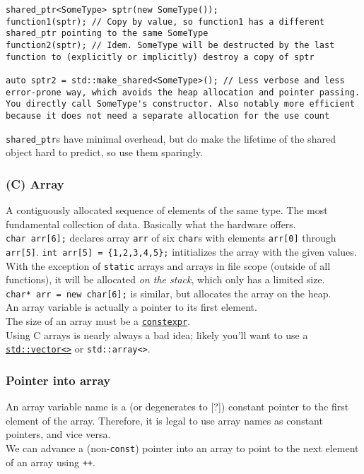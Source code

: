 \documentclass[8pt, table, xcdraw]{article}%
\begin{document}
\begin{lstlisting}
shared_ptr<SomeType> sptr(new SomeType());
function1(sptr); // Copy by value, so function1 has a different shared_ptr pointing to the same SomeType
function2(sptr); // Idem. SomeType will be destructed by the last function to (explicitly or implicitly) destroy a copy of sptr

auto sptr2 = std::make_shared<SomeType>(); // Less verbose and less error-prone way, which avoids the heap allocation and pointer passing. You directly call SomeType's constructor. Also notably more efficient because it does not need a separate allocation for the use count
\end{lstlisting}

\lstinline{shared_ptr}s have minimal overhead, but do make the lifetime of the shared object hard to predict, so use them sparingly.

\subsubsection{(C) Array} \label{array}
A contiguously allocated sequence of elements of the same type. The most fundamental collection of data. Basically what the hardware offers.\\
\lstinline{char arr[6];} declares array \lstinline{arr} of six \lstinline{char}s with elements \lstinline{arr[0]} through \lstinline{arr[5]}. \lstinline|int arr[5] = {1,2,3,4,5};| intitializes the array with the given values.\\
With the exception of \lstinline{static} arrays and arrays in file scope (outside of all functions), it will be allocated \textit{on the stack}, which only has a limited size.\\
\lstinline|char* arr = new char[6];| is similar, but allocates the array on the heap.\\
An array variable is actually a pointer to its first element.\\
The size of an array must be a \hyperref[constexpr]{\lstinline{constexpr}}.\\
Using C arrays is nearly always a bad idea; likely you'll want to use a \hyperref[std_vector]{\lstinline{std::vector<>}} or \lstinline{std::array<>}.

\subsubsection{Pointer into array}
An array variable name is a (or degenerates to [?]) constant pointer to the first element of the array. Therefore, it is legal to use array names as constant pointers, and vice versa.\\
We can advance a (non-\lstinline{const}) pointer into an array to point to the next element of an array using \lstinline{++}.
\end{document}
